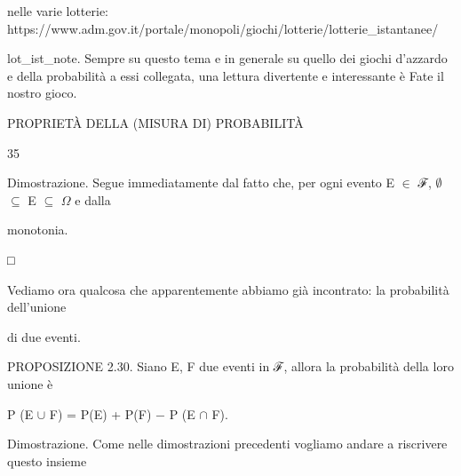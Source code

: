 \documentclass[a4paper,portrait,12pt]{article}
\begin{document}
\begin{flushleft}
nelle varie lotterie: https://www.adm.gov.it/portale/monopoli/giochi/lotterie/lotterie\_istantanee/
\end{flushleft}


\begin{flushleft}
lot\_ist\_note. Sempre su questo tema e in generale su quello dei giochi d'azzardo e della probabilit\`{a} a essi collegata, una lettura divertente e interessante \`{e} Fate il nostro gioco.
\end{flushleft}





\begin{flushleft}
 PROPRIET\`{A} DELLA (MISURA DI) PROBABILIT\`{A}
\end{flushleft}





35





\begin{flushleft}
Dimostrazione. Segue immediatamente dal fatto che, per ogni evento E $\in$ ℱ, $\emptyset$ $\subseteq$ E $\subseteq$ $\Omega$ e dalla
\end{flushleft}


\begin{flushleft}
monotonia.
\end{flushleft}


□


\begin{flushleft}
Vediamo ora qualcosa che apparentemente abbiamo gi\`{a} incontrato: la probabilit\`{a} dell'unione
\end{flushleft}


\begin{flushleft}
di due eventi.
\end{flushleft}


\begin{flushleft}
PROPOSIZIONE 2.30. Siano E, F due eventi in ℱ, allora la probabilit\`{a} della loro unione \`{e}
\end{flushleft}


\begin{flushleft}
P (E $\cup$ F) = P(E) + P(F) $-$ P (E $\cap$ F).
\end{flushleft}


\begin{flushleft}
Dimostrazione. Come nelle dimostrazioni precedenti vogliamo andare a riscrivere questo insieme
\end{flushleft}
\end{document}
